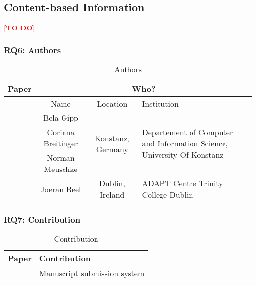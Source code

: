 
\subsection{Content-based Information}
\label{subsec:ContentBasedInformation}
\textcolor{red}{\textbf{[TO DO]}}


\clearpage
\subsubsection{RQ6: Authors}

\begin{longtable}{ |c|c|c|p{5cm}| }
	\caption{Authors} \\
	\hline
 	\textbf{Paper} & \multicolumn{3}{|c|}{\textbf{Who?}} \\ [0.5ex] 
 	\hline\hline
 	\endhead
 	\multirow{5}{*}{\cite{2017_Gipp}} & \cellcolor{Gray}Name & \cellcolor{Gray}Location & \cellcolor{Gray}Institution \\ 
 	\cline{2-4}
	 & Bela Gipp &  \multirow{3}{*}{Konstanz, Germany} & \multirow{3}{*}{\parbox{5cm}{\centering Departement of Computer and Information Science, University Of Konstanz}} \\
	 \cline{2-2}
	 & Corinna Breitinger &  & \\
	 \cline{2-2}
	 & Norman Meuschke &  & \\
	 \cline{2-4}
	 & Joeran Beel & Dublin, Ireland & ADAPT Centre Trinity College Dublin \\
	\hline
\end{longtable}

\clearpage
\subsubsection{RQ7: Contribution}

\begin{longtable}{ |c|p{6cm}| }
	\caption{Contribution} \\
	\hline
 	\textbf{Paper} & \textbf{Contribution} \\ [0.5ex] 
 	\hline\hline
 	\endhead
 	\cite{2017_Gipp} & Manuscript submission system\\
	\hline
\end{longtable}

\clearpage
